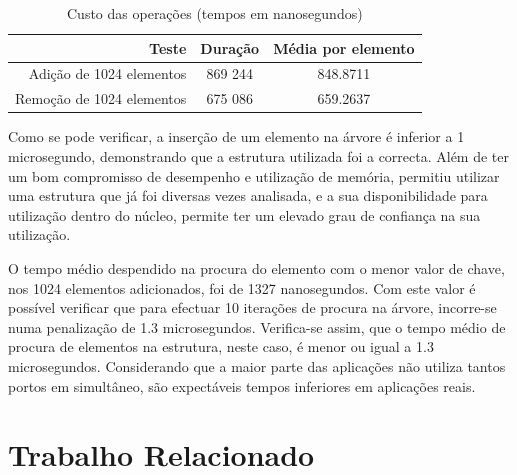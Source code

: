 \documentclass[a4paper]{llncs}
\begin{document}
\vspace{-0.5cm}
\begin{table}
\begin{center}
\caption{Custo das operações (tempos em nanosegundos)}
\begin{tabular}{ | r | c | c | }
\hline
\hspace{1cm} Teste \hspace{1.5cm} & \hspace{1cm}Duração\hspace{1cm} &  Média por
elemento \\
\hline
Adição de 1024 elementos & 869 244 & 848.8711 \\
\hline
Remoção de 1024 elementos & 675 086 & 659.2637\\
\hline

\hline
\end{tabular}
\label{tab:tree_info}
\end{center}
\end{table}
\vspace{-0.8cm}

Como se pode verificar, a inserção de um elemento na árvore é inferior a 1 microsegundo, demonstrando que a estrutura utilizada foi a correcta.
 Além de ter um bom compromisso de desempenho e utilização de memória, permitiu utilizar uma estrutura que já foi diversas vezes analisada, e a sua disponibilidade para utilização dentro do núcleo, permite ter um elevado grau de confiança na sua utilização.

O tempo médio despendido na procura do elemento com o menor valor de chave, nos 1024 elementos adicionados, foi de 1327 nanosegundos.
 Com este valor é possível verificar que para efectuar 10 iterações de procura na árvore, incorre-se numa penalização de 1.3 microsegundos. 
 Verifica-se assim, que o tempo médio de procura de elementos na estrutura, neste caso, é menor ou igual a 1.3 microsegundos.
 Considerando que a maior parte das aplicações não utiliza tantos portos em simultâneo, são expectáveis tempos inferiores em aplicações reais.

\section{Trabalho Relacionado}
\label{sec:related_work}
\end{document}

